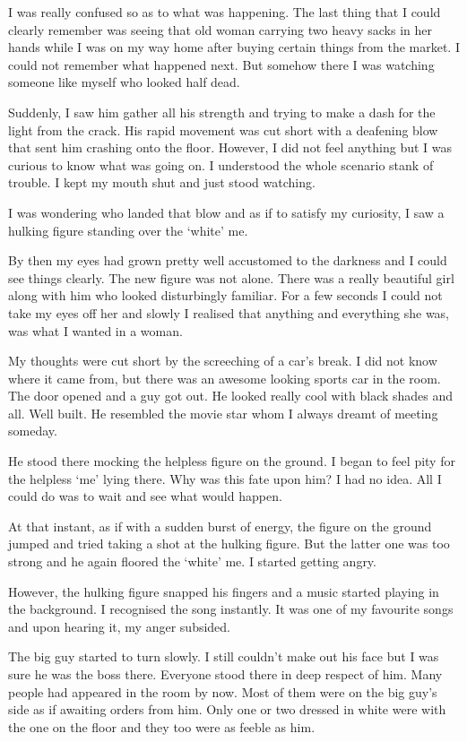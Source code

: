 \documentclass[twoside,11pt]{article}
\begin{document}
I was really confused so as to what was happening. The last thing that I could clearly remember was seeing that old woman carrying two heavy sacks in her hands while I was on my way home after buying certain things from the market. I could not remember what happened next. But somehow there I was watching someone like myself who looked half dead.

Suddenly, I saw him gather all his strength and trying to make a dash for the light from the crack. His rapid movement was cut short with a deafening blow that sent him crashing onto the floor. However, I did not feel anything but I was curious to know what was going on. I understood the whole scenario stank of trouble. I kept my mouth shut and just stood watching.

I was wondering who landed that blow and as if to satisfy my curiosity, I saw a hulking figure standing over the ‘white’ me.

By then my eyes had grown pretty well accustomed to the darkness and I could see things clearly. The new figure was not alone. There was a really beautiful girl along with him who looked disturbingly familiar. For a few seconds I could not take my eyes off her and slowly I realised that anything and everything she was, was what I wanted in a woman.

My thoughts were cut short by the screeching of a car’s break. I did not know where it came from, but there was an awesome looking sports car in the room. The door opened and a guy got out. He looked really cool with black shades and all. Well built. He resembled the movie star whom I always dreamt of meeting someday.

He stood there mocking the helpless figure on the ground. I began to feel pity for the helpless ‘me’ lying there. Why was this fate upon him? I had no idea. All I could do was to wait and see what would happen.

At that instant, as if with a sudden burst of energy, the figure on the ground jumped and tried taking a shot at the hulking figure. But the latter one was too strong and he again floored the ‘white’ me. I started getting angry.

However, the hulking figure snapped his fingers and a music started playing in the background. I recognised the song instantly. It was one of my favourite songs and upon hearing it, my anger subsided.

The big guy started to turn slowly. I still couldn’t make out his face but I was sure he was the boss there. Everyone stood there in deep respect of him. Many people had appeared in the room by now. Most of them were on the big guy’s side as if awaiting orders from him. Only one or two dressed in white were with the one on the floor and they too were as feeble as him.
\end{document}
